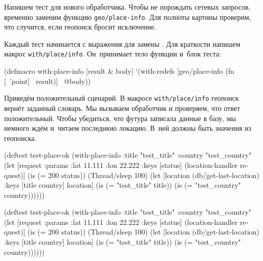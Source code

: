 
Напишем тест для нового обработчика. Чтобы не порождать сетевых запросов,
временно заменим функцию \verb|geo/place-info|. Для полноты картины проверим,
что случится, если геопоиск бросит исключение.

Каждый тест начинается с выражения  для замены
. Для краткости напишем макрос
\texttt{with\-/place\-/info}. Он~принимает тело функции и~блок теста:

\begin{english}
  \begin{clojure}
(defmacro with-place-info
  [result & body]
  `(with-redefs [geo/place-info
                 (fn [~'point] ~result)]
     ~@body))
  \end{clojure}
\end{english}

Приведём положительный сценарий. В макросе \texttt{with\-/place\-/info} геопоиск
вернёт заданный словарь. Мы вызываем обработчик и проверяем, что ответ
положительный. Чтобы убедиться, что футура записала данные в базу, мы немного
ждём и~читаем последнюю локацию. В~ней должны быть значения из геопоиска.

\ifnarrow

\begin{english}
  \begin{clojure}
(deftest test-place-ok
  (with-place-info
    {:title "test_title"
     :country "test_country"}
    (let [request {:params
                   {:lat 11.111
                    :lon 22.222}}
          {:keys [status]}
          (location-handler request)]
      (is (= 200 status))
      (Thread/sleep 100)
      (let [location
            (db/get-last-location)
            {:keys [title country]}
            location]
        (is (= "test_title" title))
        (is (= "test_country"
               country))))))
  \end{clojure}
\end{english}

\else

\begin{english}
  \begin{clojure}
(deftest test-place-ok
  (with-place-info
    {:title "test_title"
     :country "test_country"}
    (let [request {:params {:lat 11.111 :lon 22.222}}
          {:keys [status]} (location-handler request)]
      (is (= 200 status))
      (Thread/sleep 100)
      (let [location (db/get-last-location)
            {:keys [title country]} location]
        (is (= "test_title" title))
        (is (= "test_country" country))))))
  \end{clojure}
\end{english}

